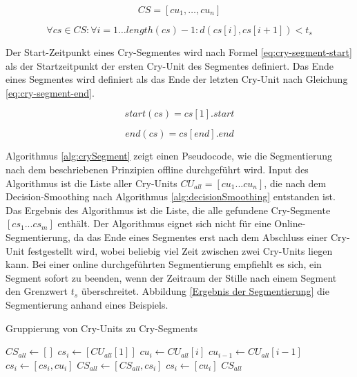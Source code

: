 \begin{equation}
CS = [cu_1 ,  \ldots,  cu_n]
\label{eq:cry-segment}
\end{equation}

\begin{equation}
\forall cs \in CS: \forall i = 1 \ldots length(cs)-1 : d(cs[i], cs[i+1]) < t_{s}
\label{eq:cry-segment-nb}
\end{equation}

Der Start-Zeitpunkt eines Cry-Segmentes wird nach Formel \ref{eq:cry-segment-start} als der Startzeitpunkt der ersten Cry-Unit des Segmentes definiert. Das Ende eines Segmentes wird definiert als das Ende der letzten Cry-Unit nach Gleichung \ref{eq:cry-segment-end}.

\begin{equation}
start(cs) = cs[1].start
\label{eq:cry-segment-start}
\end{equation}

\begin{equation}
end(cs) = cs[end].end
\label{eq:cry-segment-end}
\end{equation}

Algorithmus \ref{alg:crySegment} zeigt einen Pseudocode, wie die Segmentierung nach dem beschriebenen Prinzipien offline durchgeführt wird. Input des Algorithmus ist die Liste aller Cry-Units $CU_{all} = [cu_1 ... cu_n]$, die nach dem Decision-Smoothing nach Algorithmus \ref{alg:decisionSmoothing} entstanden ist.  Das Ergebnis des Algorithmus ist die Liste, die alle gefundene Cry-Segmente  $[cs_1 ...  cs_m]$ enthält. Der Algorithmus eignet sich nicht für eine Online-Segmentierung, da das Ende eines Segmentes erst nach dem Abschluss einer Cry-Unit festgestellt wird, wobei beliebig viel Zeit zwischen zwei Cry-Units liegen kann. Bei einer online durchgeführten Segmentierung empfiehlt es sich, ein Segment sofort zu beenden, wenn der Zeitraum der Stille nach einem Segment den Grenzwert $t_s$ überschreitet. Abbildung \ref{Ergebnis der Segmentierung} die Segmentierung anhand eines Beispiels.

\begin{algorithm}[H]
	\caption{Gruppierung von Cry-Units zu Cry-Segments}
	\label{alg:crySegment}
	\begin{algorithmic}[1]
		\State $ CS_{all} \gets []$
		\State $ cs_i \gets [CU_{all}[1]]$
						\State $ cu_i \gets CU_{all}[i]$
						\State $cu_{i-1} \gets CU_{all}[i-1]$
								\State $cs_i \gets [cs_i , cu_i]$
						\Else
								\State $CS_{all} \gets [CS_{all}, cs_i]$
								\State $cs_i \gets [cu_i]$
						\EndIf
				\EndFor
		\Return $CS_{all}$
		
		\EndFunction
		
	\end{algorithmic}
\end{algorithm}

